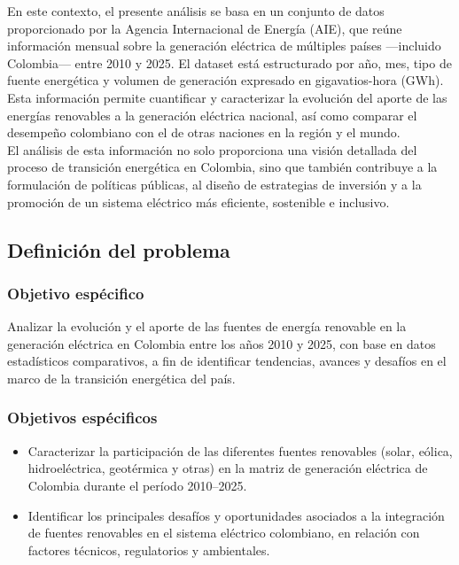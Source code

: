 \documentclass{article}
\begin{document}
En este contexto, el presente análisis se basa en un conjunto de datos proporcionado por la Agencia Internacional de Energía (AIE), que reúne información mensual sobre la generación eléctrica de múltiples países —incluido Colombia— entre 2010 y 2025. El dataset está estructurado por año, mes, tipo de fuente energética y volumen de generación expresado en gigavatios-hora (GWh). Esta información permite cuantificar y caracterizar la evolución del aporte de las energías renovables a la generación eléctrica nacional, así como comparar el desempeño colombiano con el de otras naciones en la región y el mundo.\\

El análisis de esta información no solo proporciona una visión detallada del proceso de transición energética en Colombia, sino que también contribuye a la formulación de políticas públicas, al diseño de estrategias de inversión y a la promoción de un sistema eléctrico más eficiente, sostenible e inclusivo.\\

\subsection{Definici\'on del problema}

\subsubsection{Objetivo esp\'ecifico}
Analizar la evolución y el aporte de las fuentes de energía renovable en la generación eléctrica en Colombia entre los años 2010 y 2025, con base en datos estadísticos comparativos, a fin de identificar tendencias, avances y desafíos en el marco de la transición energética del país.

\subsubsection{Objetivos esp\'ecificos}

\begin{itemize}
	\item Caracterizar la participación de las diferentes fuentes renovables (solar, eólica, hidroeléctrica, geotérmica y otras) en la matriz de generación eléctrica de Colombia durante el período 2010–2025.
	\item Identificar los principales desafíos y oportunidades asociados a la integración de fuentes renovables en el sistema eléctrico colombiano, en relación con factores técnicos, regulatorios y ambientales.
\end{itemize}
\end{document}

